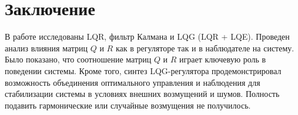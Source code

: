 \section{Заключение}
В работе исследованы LQR, фильтр Калмана и LQG (LQR + LQE). Проведен анализ влияния 
матриц $Q$ и $R$ как в регуляторе так и в наблюдателе на систему. 
Было показано, что соотношение матриц $Q$ и $R$ играет ключевую роль в поведении системы. 
Кроме того, синтез LQG-регулятора продемонстрировал возможность объединения 
оптимального управления и наблюдения для стабилизации системы в условиях 
внешних возмущений и шумов. Полность подавить гармонические или случайные 
возмущения не получилось.